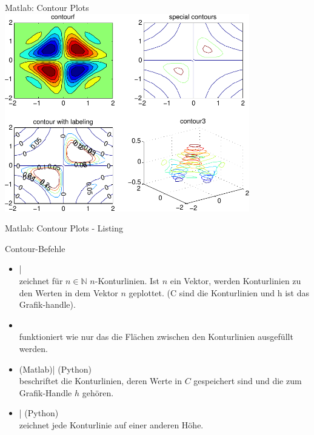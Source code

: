 \documentclass[hyperref={xetex}]{beamer}
\begin{document}
% 
% 
\begin{frame}[fragile]{Matlab: Contour Plots}
\hfil\includegraphics[width=0.8\textwidth]{figures/beispiel_function_plot_contour}\hfil
\end{frame}
% 
% 
\begin{frame}[fragile]{Matlab: Contour Plots - Listing}
\end{frame}
% 
% 
\begin{frame}[fragile]{Contour-Befehle}
\begin{itemize}
  \item {}| \\ 
    zeichnet f\"ur $n\in \mathbb{N}$
  $n$-Konturlinien. Ist $n$ ein Vektor, werden Konturlinien zu den Werten in
  dem Vektor $n$ geplottet. (C sind die Konturlinien und h ist das Grafik-handle).
\item {}\\
  funktioniert wie  nur das die Flächen
  zwischen den Konturlinien ausgefüllt werden.
\item {} (Matlab)| (Python)\\ 
  beschriftet die Konturlinien, deren Werte in $C$
  gespeichert sind und die zum Grafik-Handle $h$ gehören.
\item {}| (Python)\\  
  zeichnet jede Konturlinie auf einer anderen H\"ohe.
\end{itemize}
\end{frame}
% 
% 
\end{document}

